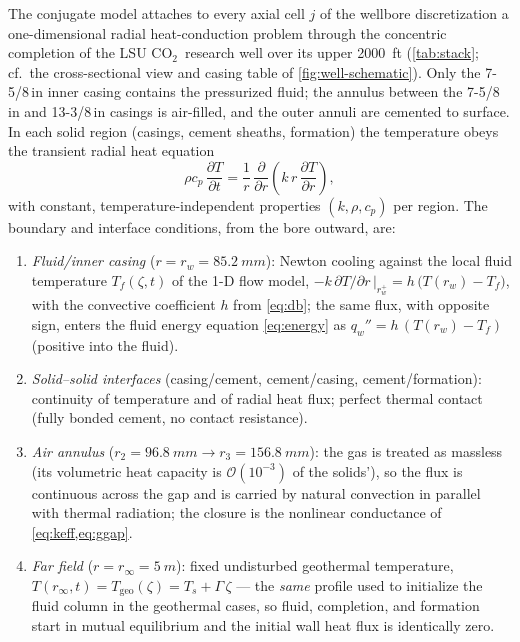 \documentclass[11pt]{article}
\newcommand{\co}{CO$_2$}
\begin{document}
The conjugate model attaches to every axial cell $j$ of the wellbore
discretization a one-dimensional radial heat-conduction problem through
the concentric completion of the LSU \co\ research well over its upper
\SI{2000}{ft} (\cref{tab:stack}; cf.\ the cross-sectional view and
casing table of \cref{fig:well-schematic}). Only the 7-5/8\,in inner
casing contains the pressurized fluid; the annulus between the
7-5/8\,in and 13-3/8\,in casings is air-filled, and the outer annuli
are cemented to surface. In each solid region (casings, cement
sheaths, formation) the temperature obeys the transient radial heat
equation
\begin{equation}
\rho c_p\,\frac{\partial T}{\partial t}
 = \frac{1}{r}\,\frac{\partial}{\partial r}
 \!\left(k\,r\,\frac{\partial T}{\partial r}\right),
\label{eq:radialpde}
\end{equation}
with constant, temperature-independent properties $(k, \rho, c_p)$ per
region. The boundary and interface conditions, from the bore outward,
are:
\begin{enumerate}
\item \emph{Fluid/inner casing} ($r = r_w = \SI{85.2}{mm}$): Newton
cooling against the local fluid temperature $T_f(\zeta, t)$ of the 1-D
flow model,
$-k\,\partial T/\partial r\,\big|_{r_w^+} = h\,\bigl(T(r_w) -
T_f\bigr)$, with the
convective coefficient $h$ from \cref{eq:db}; the same flux, with
opposite sign, enters the fluid energy equation
\cref{eq:energy} as $q_w'' = h\,(T(r_w) - T_f)$ (positive into the
fluid).
\item \emph{Solid--solid interfaces} (casing/cement, cement/casing,
cement/formation): continuity of temperature and of radial heat flux;
perfect thermal contact (fully bonded cement, no contact resistance).
\item \emph{Air annulus} ($r_2 = \SI{96.8}{mm} \to r_3 =
\SI{156.8}{mm}$): the gas is treated as massless (its volumetric heat
capacity is $\mathcal{O}(10^{-3})$ of the solids'), so the flux is
continuous across the gap and is carried by natural convection in
parallel with thermal radiation; the closure is the nonlinear
conductance of \cref{eq:keff,eq:ggap}.
\item \emph{Far field} ($r = r_\infty = \SI{5}{m}$): fixed undisturbed
geothermal temperature, $T(r_\infty, t) = T_{\mathrm{geo}}(\zeta) =
T_s + \Gamma\,\zeta$ --- the \emph{same} profile used to initialize
the fluid column in the geothermal cases, so fluid, completion, and
formation start in mutual equilibrium and the initial wall heat flux
is identically zero.
\end{enumerate}
\end{document}

